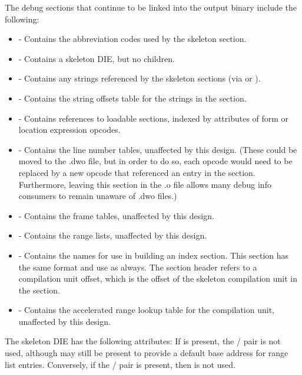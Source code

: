 The debug sections that continue to be linked into the
output binary include the following:
\begin{itemize}
\item
\dotdebugabbrev{} - Contains the abbreviation codes used by the
skeleton \dotdebuginfo{} section.
\item
\dotdebuginfo{} - Contains a skeleton \DWTAGcompileunit{} DIE,
but no children.
\item
\dotdebugstr{} - Contains any strings referenced by the skeleton
\dotdebuginfo{} sections (via \DWFORMstrp{} or \DWFORMstrx{}).
\item
\dotdebugstroffsets{} - Contains the string offsets table for
the strings in the \dotdebugstr{} section.
\item
\dotdebugaddr{} - Contains references to loadable sections,
indexed by attributes of form \DWFORMaddrx{} or location
expression \DWOPaddrx{} opcodes.
\item
\dotdebugline{} - Contains the line number tables, unaffected by
this design. (These could be moved to the .dwo file, but in
order to do so, each \DWLNEsetaddress{} opcode would need to
be replaced by a new opcode that referenced an entry in the
\dotdebugaddr{} section. Furthermore, leaving this section in the
.o file allows many debug info consumers to remain unaware of
.dwo files.)
\item
\dotdebugframe{} - Contains the frame tables, unaffected by this
design.
\item
\dotdebugranges{} - Contains the range lists, unaffected by this
design.
\item
\dotdebugnames{} - Contains the names for use in
building an index section. This section has the same
format and use as always. The section header refers to a
compilation unit offset, which is the offset of the
skeleton compilation unit in the \dotdebuginfo{} section.
\item
\dotdebugaranges{} - Contains the accelerated range lookup table
for the compilation unit, unaffected by this design.
\end{itemize}

The skeleton \DWTAGcompileunit{} DIE has the following attributes:
\dag{} If \DWATranges{} is present, the \DWATlowpc{}/\DWAThighpc{}
pair is not used, although \DWATlowpc{} may still be present
to provide a default base address for range list entries.
Conversely, if the \DWATlowpc/\linebreak[0]\DWAThighpc{} pair is
present, then \DWATranges{} is not used.


